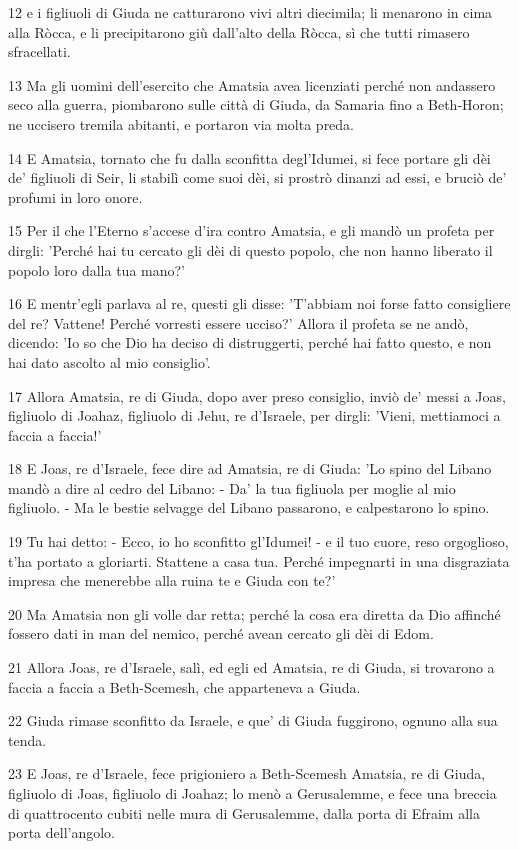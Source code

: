\par 12 e i figliuoli di Giuda ne catturarono vivi altri diecimila; li menarono in cima alla Ròcca, e li precipitarono giù dall'alto della Ròcca, sì che tutti rimasero sfracellati.
\par 13 Ma gli uomini dell'esercito che Amatsia avea licenziati perché non andassero seco alla guerra, piombarono sulle città di Giuda, da Samaria fino a Beth-Horon; ne uccisero tremila abitanti, e portaron via molta preda.
\par 14 E Amatsia, tornato che fu dalla sconfitta degl'Idumei, si fece portare gli dèi de' figliuoli di Seir, li stabilì come suoi dèi, si prostrò dinanzi ad essi, e bruciò de' profumi in loro onore.
\par 15 Per il che l'Eterno s'accese d'ira contro Amatsia, e gli mandò un profeta per dirgli: 'Perché hai tu cercato gli dèi di questo popolo, che non hanno liberato il popolo loro dalla tua mano?'
\par 16 E mentr'egli parlava al re, questi gli disse: 'T'abbiam noi forse fatto consigliere del re? Vattene! Perché vorresti essere ucciso?' Allora il profeta se ne andò, dicendo: 'Io so che Dio ha deciso di distruggerti, perché hai fatto questo, e non hai dato ascolto al mio consiglio'.
\par 17 Allora Amatsia, re di Giuda, dopo aver preso consiglio, inviò de' messi a Joas, figliuolo di Joahaz, figliuolo di Jehu, re d'Israele, per dirgli: 'Vieni, mettiamoci a faccia a faccia!'
\par 18 E Joas, re d'Israele, fece dire ad Amatsia, re di Giuda: 'Lo spino del Libano mandò a dire al cedro del Libano: - Da' la tua figliuola per moglie al mio figliuolo. - Ma le bestie selvagge del Libano passarono, e calpestarono lo spino.
\par 19 Tu hai detto: - Ecco, io ho sconfitto gl'Idumei! - e il tuo cuore, reso orgoglioso, t'ha portato a gloriarti. Stattene a casa tua. Perché impegnarti in una disgraziata impresa che menerebbe alla ruina te e Giuda con te?'
\par 20 Ma Amatsia non gli volle dar retta; perché la cosa era diretta da Dio affinché fossero dati in man del nemico, perché avean cercato gli dèi di Edom.
\par 21 Allora Joas, re d'Israele, salì, ed egli ed Amatsia, re di Giuda, si trovarono a faccia a faccia a Beth-Scemesh, che apparteneva a Giuda.
\par 22 Giuda rimase sconfitto da Israele, e que' di Giuda fuggirono, ognuno alla sua tenda.
\par 23 E Joas, re d'Israele, fece prigioniero a Beth-Scemesh Amatsia, re di Giuda, figliuolo di Joas, figliuolo di Joahaz; lo menò a Gerusalemme, e fece una breccia di quattrocento cubiti nelle mura di Gerusalemme, dalla porta di Efraim alla porta dell'angolo.
